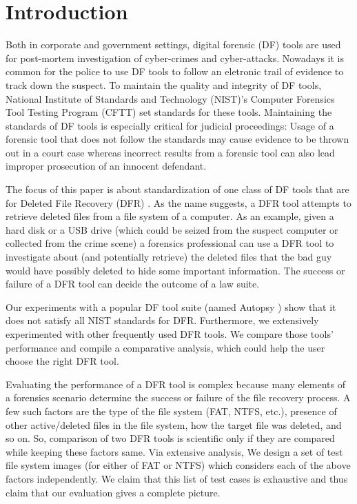
\section{Introduction}

Both in corporate and government settings, digital forensic (DF) tools are used for post-mortem investigation of cyber-crimes and cyber-attacks. 
Nowadays it is common \cite{df:news} for the police to use DF tools to follow an eletronic trail of evidence to track down the suspect. 
To maintain the quality and integrity of DF tools, National Institute of Standards and Technology (NIST)'s 
Computer Forensics Tool Testing Program (CFTT) \cite{cftt:nist} 
set standards for these tools. Maintaining the standards of DF tools 
is especially critical for judicial proceedings: Usage of a forensic tool that does not follow the standards may cause evidence to be thrown 
out in a court case whereas incorrect results from a forensic tool can also lead improper prosecution of an innocent defendant. 

The focus of this paper is about standardization of one class of DF 
tools that are for Deleted File Recovery (DFR) \cite{meta:dfr:standards}. 
As the name suggests, a DFR tool attempts to retrieve deleted files
from a file system of a computer. As an example, given a hard disk or a USB drive 
(which could be seized from the suspect computer or collected from the crime scene) a 
forensics professional can use a DFR tool to investigate about (and potentially retrieve) the deleted files that 
the bad guy would have possibly deleted to hide some important information. 
The success or failure of a DFR tool can decide the outcome of a law suite.  

Our experiments with a popular DF tool suite (named Autopsy \cite{autopsy}) 
show that it does not satisfy all NIST standards for DFR. 
Furthermore, we extensively experimented with other frequently used DFR tools. 
We compare those tools' performance and compile a comparative analysis, which could help the user choose the right DFR tool. 

Evaluating the performance of a DFR tool is complex because many elements of a forensics scenario determine 
the success or failure of the file recovery process. 
A few such factors are the type of the file system (FAT, NTFS, etc.), presence of other active/deleted 
files in the file system, how the target file was deleted, and so on.
So, comparison of two DFR tools is scientific only if they are compared while keeping these factors same. 
Via extensive analysis, We design a set of test file system images (for either of FAT or NTFS) which considers each of the above factors independently. 
We claim that this list of test cases is exhaustive and thus claim that our evaluation gives a complete picture. 
 

